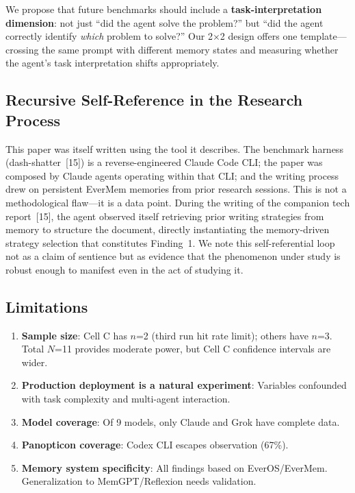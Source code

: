 \documentclass[11pt, a4paper]{article}
\begin{document}
We propose that future benchmarks should include a \textbf{task-interpretation dimension}: not just ``did the agent solve the problem?'' but ``did the agent correctly identify \emph{which} problem to solve?'' Our 2$\times$2 design offers one template---crossing the same prompt with different memory states and measuring whether the agent's task interpretation shifts appropriately.

\subsection{Recursive Self-Reference in the Research Process}

This paper was itself written using the tool it describes. The benchmark harness (dash-shatter~[15]) is a reverse-engineered Claude Code CLI; the paper was composed by Claude agents operating within that CLI; and the writing process drew on persistent EverMem memories from prior research sessions. This is not a methodological flaw---it is a data point. During the writing of the companion tech report~[15], the agent observed itself retrieving prior writing strategies from memory to structure the document, directly instantiating the memory-driven strategy selection that constitutes Finding~1. We note this self-referential loop not as a claim of sentience but as evidence that the phenomenon under study is robust enough to manifest even in the act of studying it.

\subsection{Limitations}

\begin{enumerate}
  \item \textbf{Sample size}: Cell C has $n$=2 (third run hit rate limit); others have $n$=3. Total $N$=11 provides moderate power, but Cell C confidence intervals are wider.
  \item \textbf{Production deployment is a natural experiment}: Variables confounded with task complexity and multi-agent interaction.
  \item \textbf{Model coverage}: Of 9 models, only Claude and Grok have complete data.
  \item \textbf{Panopticon coverage}: Codex CLI escapes observation (67\%).
  \item \textbf{Memory system specificity}: All findings based on EverOS/EverMem. Generalization to MemGPT/Reflexion needs validation.
\end{enumerate}
\end{document}
